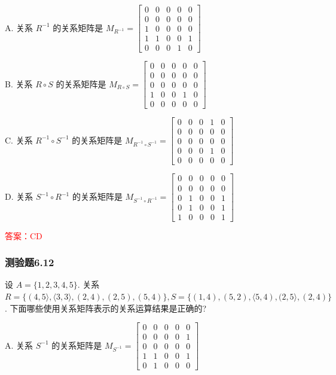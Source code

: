 \documentclass[UTF8, heading=true]{ctexart}
\begin{document}
A. 关系 $R^{-1}$ 的关系矩阵是 $M_{R^{-1}}=\left[\begin{array}{lllll}0 & 0 & 0 & 0 & 0 \\ 0 & 0 & 0 & 0 & 0 \\ 1 & 0 & 0 & 0 & 0 \\ 1 & 1 & 0 & 0 & 1 \\ 0 & 0 & 0 & 1 & 0\end{array}\right]$

B. 关系 $R \circ S$ 的关系矩阵是 $M_{R \circ S}=\left[\begin{array}{ccccc}0 & 0 & 0 & 0 & 0 \\ 0 & 0 & 0 & 0 & 0 \\ 0 & 0 & 0 & 0 & 0 \\ 1 & 0 & 0 & 1 & 0 \\ 0 & 0 & 0 & 0 & 0\end{array}\right]$

C. 关系 $R^{-1} \circ S^{-1}$ 的关系矩阵是 $M_{R^{-1} \circ S^{-1}}=\left[\begin{array}{ccccc}0 & 0 & 0 & 1 & 0 \\ 0 & 0 & 0 & 0 & 0 \\ 0 & 0 & 0 & 0 & 0 \\ 0 & 0 & 0 & 1 & 0 \\ 0 & 0 & 0 & 0 & 0\end{array}\right]$

D. 关系 $S^{-1} \circ R^{-1}$ 的关系矩阵是 $M_{S^{-1} \circ R^{-1}}=\left[\begin{array}{ccccc}0 & 0 & 0 & 0 & 0 \\ 0 & 0 & 0 & 0 & 0 \\ 0 & 1 & 0 & 0 & 1 \\ 0 & 1 & 0 & 0 & 1 \\ 1 & 0 & 0 & 0 & 1\end{array}\right]$

\textcolor{red}{答案：CD}

\subsubsection{测验题6.12}

设 $A=\{1,2,3,4,5\}$. 关系 $R=\{(4,5\rangle,\langle 3,3\rangle,(2,4),(2,5),(5,4)\}, S=\{(1,4),(5,2),\langle 5,4),(2,5\rangle,(2,4)\}$.
下面哪些使用关系矩阵表示的关系运算结果是正确的?

A. 关系 $S^{-1}$ 的关系矩阵是 $M_{S^{-1}}=\left[\begin{array}{ccccc}0 & 0 & 0 & 0 & 0 \\ 0 & 0 & 0 & 0 & 1 \\ 0 & 0 & 0 & 0 & 0 \\ 1 & 1 & 0 & 0 & 1 \\ 0 & 1 & 0 & 0 & 0\end{array}\right]$
\end{document}
